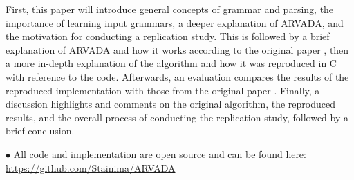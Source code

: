 \vspace{\baselineskip}
First, this paper will introduce general concepts of grammar and parsing, the importance of learning input grammars, a deeper explanation of ARVADA, and the motivation for conducting a replication study. This is followed by a brief explanation of ARVADA and how it works according to the original paper \cite{kulkarniLearningHighlyRecursive2021}, then a more in-depth explanation of the algorithm and how it was reproduced in C with reference to the code. Afterwards, an evaluation compares the results of the reproduced implementation with those from the original paper \cite{kulkarniLearningHighlyRecursive2021}. Finally, a discussion highlights and comments on the original algorithm, the reproduced results, and the overall process of conducting the replication study, followed by a brief conclusion.

$\bullet$ All code and implementation are open source and can be found here: \url{https://github.com/Stainima/ARVADA}
